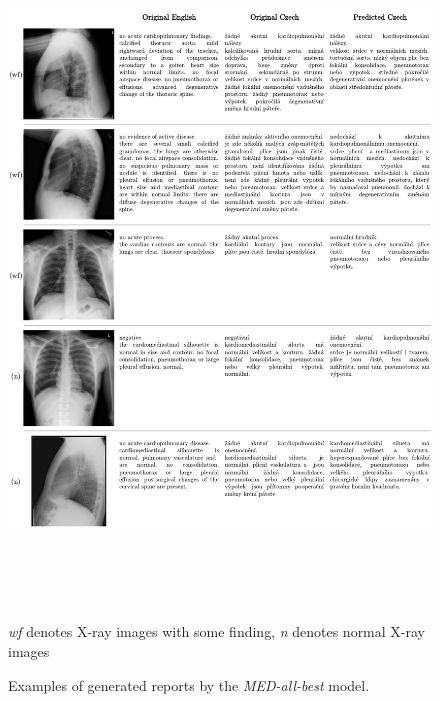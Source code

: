 \begin{figure}[h]\centering
\includegraphics[width=145mm, height=177.5mm]{../img/Examples1}
\caption{Examples of generated reports by the \textit{MED-all-best} model.}
\label{fig01:Examples1}
\textit{wf} denotes X-ray images with some finding, \textit{n} denotes normal X-ray images
\end{figure}

